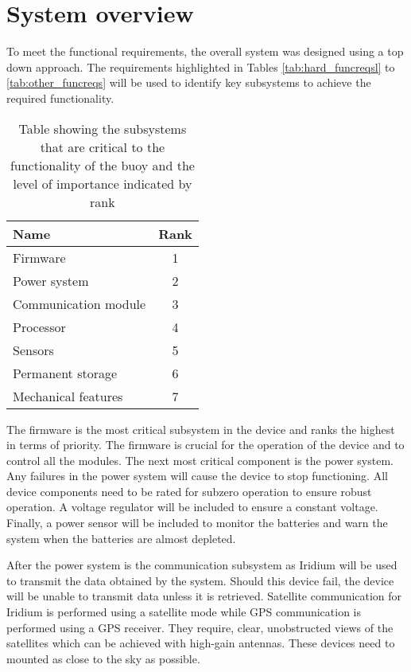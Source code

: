 \section{System overview}
\label{sec:ch3_sysoverview}
To meet the functional requirements, the overall system was designed using a top down approach. The requirements highlighted in Tables \ref{tab:hard_funcreqsl} to \ref{tab:other_funcreqs} will be used to identify key subsystems to achieve the required functionality.

\begin{table}[H]
  \centering
  \caption{Table showing the subsystems that are critical to the functionality of the buoy and the level of importance indicated by rank}
  \setlength{\extrarowheight}{2.5pt}
  \begin{tabular}{l c }
  \hline
  \textbf{Name} & \textbf{Rank}\\
  \hline
  \hline
  Firmware & 1\\
  \hline
  Power system & 2 \\
  \hline
  Communication module & 3\\
  \hline
  Processor & 4\\
  \hline
  Sensors & 5\\
  \hline
  Permanent storage & 6 \\
  \hline
  Mechanical features & 7 \\
  \hline
  \hline
  \end{tabular}

  \label{tab:subsys}
\end{table}

The firmware is the most critical subsystem in the device and ranks the highest in terms of priority. The firmware is crucial for the operation of the device and to control all the modules. The next most critical component is the power system. Any failures in the power system will cause the device to stop functioning. All device components need to be rated for subzero operation to ensure robust operation. A voltage regulator will be included to ensure a constant voltage. Finally, a power sensor will be included to monitor the batteries and warn the system when the batteries are almost depleted. \par 

After the power system is the communication subsystem as Iridium will be used to transmit the data obtained by the system. Should this device fail, the device will be unable to transmit data unless it is retrieved. Satellite communication for Iridium is performed using a satellite mode while GPS communication is performed using a GPS receiver. They require, clear, unobstructed views of the satellites which can be achieved with high-gain antennas. These devices need to mounted as close to the sky as possible.\par

